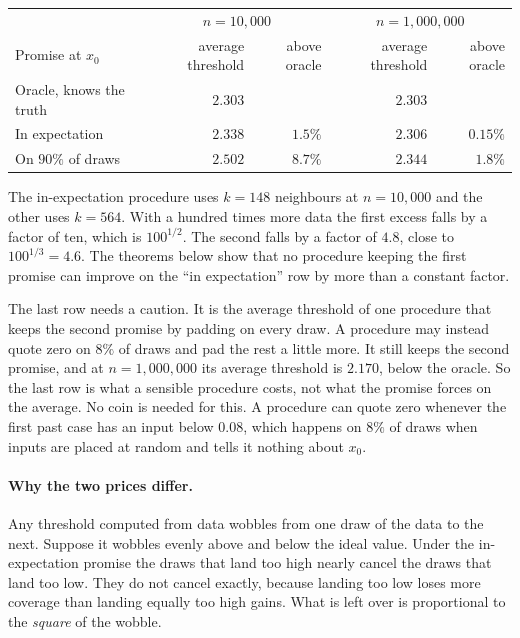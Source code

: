 \documentclass[11pt]{article}
\theoremstyle{definition}
\theoremstyle{remark}
\begin{document}
\begin{center}\setlength{\tabcolsep}{5pt}
\begin{tabular}{lrrrr}
\toprule
 & \multicolumn{2}{c}{$n=10{,}000$} & \multicolumn{2}{c}{$n=1{,}000{,}000$} \\
Promise at $x_0$ & average threshold & above oracle & average threshold & above oracle \\
\midrule
Oracle, knows the truth & $2.303$ & & $2.303$ & \\
In expectation & $2.338$ & $1.5\%$ & $2.306$ & $0.15\%$ \\
On $90\%$ of draws & $2.502$ & $8.7\%$ & $2.344$ & $1.8\%$ \\
\bottomrule
\end{tabular}
\end{center}

\noindent The in-expectation procedure uses $k=148$ neighbours at $n=10{,}000$ and the
other uses $k=564$. With a hundred times more data the first excess falls by a factor of
ten, which is $100^{1/2}$. The second falls by a factor of $4.8$, close to
$100^{1/3}=4.6$. The theorems below show that no procedure keeping the first promise can
improve on the ``in expectation'' row by more than a constant factor.

The last row needs a caution. It is the average threshold of one procedure that keeps the
second promise by padding on every draw. A procedure may instead quote zero on $8\%$ of
draws and pad the rest a little more. It still keeps the second promise, and at
$n=1{,}000{,}000$ its average threshold is $2.170$, below the oracle. So the last row is
what a sensible procedure costs, not what the promise forces on the average. No coin is
needed for this. A procedure can quote zero whenever the first past case has an input below
$0.08$, which happens on $8\%$ of draws when inputs are placed at random and tells it
nothing about $x_0$.

\paragraph{Why the two prices differ.}
Any threshold computed from data wobbles from one draw of the data to the next. Suppose it
wobbles evenly above and below the ideal value. Under the in-expectation promise the draws
that land too high nearly cancel the draws that land too low. They do not cancel exactly,
because landing too low loses more coverage than landing equally too high gains. What is left
over is proportional to the \emph{square} of the wobble.
\end{document}
